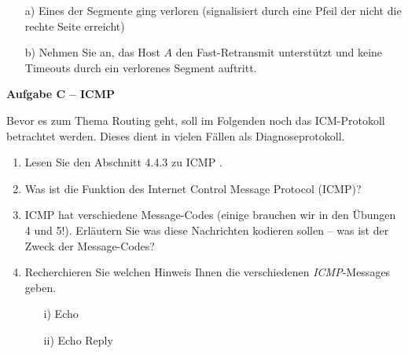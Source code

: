 \documentclass[paper=a4,fontsize=11pt]{scrartcl}%
\numberwithin{equation}{section}
\begin{document}
\begin{enumerate}
	\begin{itemize}
		\item[a)] Eines der Segmente ging verloren (signalisiert durch eine Pfeil der nicht die rechte Seite erreicht)
		\item[b)] Nehmen Sie an, das Host $A$ den Fast-Retransmit unterstützt und keine Timeouts durch ein verlorenes Segment auftritt.
	\end{itemize}
\end{enumerate}

\begin{center}\Large{\textbf{Aufgabe C -- ICMP}}\end{center}\vskip0.2in
Bevor es zum Thema Routing geht, soll im Folgenden noch das ICM-Protokoll betrachtet werden. Dieses dient in vielen Fällen als Diagnoseprotokoll.
\begin{enumerate}
	\item Lesen Sie den Abschnitt 4.4.3 zu ICMP \cite[S. 353]{Kurose2012}. 
	\item Was ist die Funktion des Internet Control Message Protocol (ICMP)?
	\item ICMP hat verschiedene Message-Codes (einige brauchen wir in den Übungen 4 und 5!). Erläutern Sie was diese Nachrichten kodieren sollen -- was ist der Zweck der Message-Codes?
	\item Recherchieren Sie welchen Hinweis Ihnen die verschiedenen \emph{ICMP}-Messages geben.
		\begin{itemize}
			\item[i)] Echo
			\item[ii)] Echo Reply
		\end{itemize}
\end{enumerate}
\end{document}
